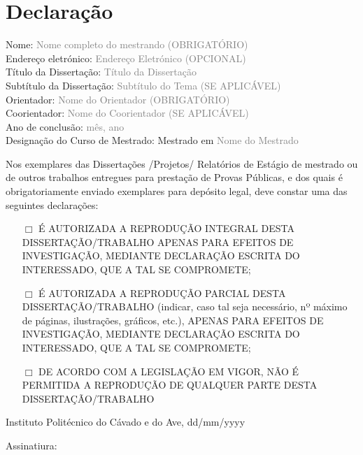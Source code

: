 \chapter{Declaração}
{
\noindent
Nome: 											\textcolor{gray}{Nome completo do mestrando (OBRIGATÓRIO)}\\
Endereço eletrónico: 							\textcolor{gray}{Endereço Eletrónico (OPCIONAL)}\\
Título da Dissertação: 							\textcolor{gray}{Título da Dissertação}\\
Subtítulo da Dissertação: 						\textcolor{gray}{Subtítulo do Tema (SE APLICÁVEL)}\\
Orientador: 									\textcolor{gray}{Nome do Orientador (OBRIGATÓRIO)}\\
Coorientador:									\textcolor{gray}{Nome do Coorientador (SE APLICÁVEL)}\\
Ano de conclusão: 								\textcolor{gray}{mês, ano}\\
Designação do Curso de Mestrado: Mestrado em 	\textcolor{gray}{Nome do Mestrado}\\
}

{
\noindent
Nos exemplares das Dissertações /Projetos/ Relatórios de Estágio de mestrado ou de outros trabalhos entregues para prestação de Provas Públicas, e dos quais é obrigatoriamente enviado exemplares para depósito legal, deve constar uma das seguintes declarações:
}

\vspace{0.5cm}

{
\begin{itemize}[align=parleft]%
\item [$\Box$]\hspace{6mm} É AUTORIZADA A REPRODUÇÃO INTEGRAL DESTA DISSERTAÇÃO/TRABALHO APENAS PARA EFEITOS DE INVESTIGAÇÃO, MEDIANTE DECLARAÇÃO ESCRITA DO INTERESSADO, QUE A TAL SE COMPROMETE;

\item [$\Box$]\hspace{6mm} É AUTORIZADA A REPRODUÇÃO PARCIAL DESTA DISSERTAÇÃO/TRABALHO (indicar, caso tal seja necessário, nº máximo de páginas, ilustrações, gráficos, etc.), APENAS PARA EFEITOS DE INVESTIGAÇÃO, MEDIANTE DECLARAÇÃO ESCRITA DO INTERESSADO, QUE A TAL SE COMPROMETE;

\item [$\Box$]\hspace{6mm} DE ACORDO COM A LEGISLAÇÃO EM VIGOR, NÃO É PERMITIDA A REPRODUÇÃO DE QUALQUER PARTE DESTA DISSERTAÇÃO/TRABALHO

\end{itemize}
}
\vspace{0.2cm}

\noindent
Instituto Politécnico do Cávado e do Ave, dd/mm/yyyy 

\vspace{0.5cm}
\noindent
Assinatiura: \underline{\hspace{9cm}}


